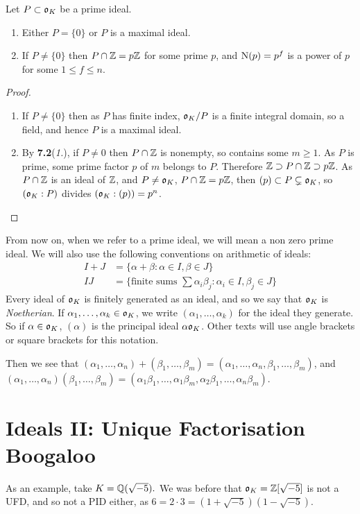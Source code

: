 \documentclass[10pt,a4paper]{article}
\begin{document}
\begin{lemma}
Let $P \subset \mathfrak{o}_K$ be a prime ideal.
\begin{enumerate}
\item Either $P = \{0\}$ or $P$ is a maximal ideal.
\item If $P \neq \{0\}$ then $P \cap \mathbb{Z} = p\mathbb{Z}$ for some prime $p$, and $\operatorname{N}(p) = p^f$ is a power of $p$ for some $1 \leq f \leq n$.
\end{enumerate}
\end{lemma}
\begin{proof}
\item
\begin{enumerate}
\item If $P \neq \{0\}$ then as $P$ has finite index, $\mathfrak{o}_K/P$ is a finite integral domain, so a field, and hence $P$ is a maximal ideal.
\item By \textbf{7.2}(\textit{1.}), if $P \neq 0$ then $P \cap \mathbb{Z}$ is nonempty, so contains some $m \geq 1$. As $P$ is prime, some prime factor $p$ of $m$ belongs to $P$. Therefore $\mathbb{Z} \supset P \cap \mathbb{Z} \supset p\mathbb{Z}$. As $P \cap \mathbb{Z}$ is an ideal of $\mathbb{Z}$, and $P \neq \mathfrak{o}_K$, $P \cap \mathbb{Z} = p\mathbb{Z}$, then $(p) \subset P \subsetneq \mathfrak{o}_K$, so $(\mathfrak{o}_K : P)$ divides $(\mathfrak{o}_K:(p)) = p^n$.
\end{enumerate}
\end{proof}
From now on, when we refer to a prime ideal, we will mean a non zero prime ideal. We will also use the following conventions on arithmetic of ideals:
\begin{align*}
I+J &= \{\alpha+\beta : \alpha \in I, \beta \in J\}\\
IJ &= \{\text{finite sums }\sum\alpha_i\beta_j : \alpha_i \in I, \beta_j \in J\}
\end{align*}
Every ideal of $\mathfrak{o}_K$ is finitely generated as an ideal, and so we say that $\mathfrak{o}_K$ is \emph{Noetherian}. If $\alpha_1, \ldots, \alpha_k \in \mathfrak{o}_K$, we write $(\alpha_1, \ldots, \alpha_k)$ for the ideal they generate. So if $\alpha \in \mathfrak{o}_K$, $(\alpha)$ is the principal ideal $\alpha \mathfrak{o}_K$. Other texts will use angle brackets or square brackets for this notation.

Then we see that $(\alpha_1, \ldots, \alpha_n) + (\beta_1, \ldots, \beta_m) = (\alpha_1, \ldots, \alpha_n, \beta_1, \ldots, \beta_m)$, and $(\alpha_1, \ldots, \alpha_n)(\beta_1, \ldots, \beta_m) = (\alpha_1\beta_1, \ldots, \alpha_1\beta_m, \alpha_2\beta_1, \ldots, \alpha_n\beta_m)$.

\section{Ideals II: Unique Factorisation Boogaloo}
As an example, take $K = \mathbb{Q}(\sqrt{-5}).$ We was before that $\mathfrak{o}_K = \mathbb{Z}[\sqrt{-5}]$ is not a UFD, and so not a PID either, as $6 = 2\cdot 3 = (1+\sqrt{-5})(1-\sqrt{-5})$.
\end{document}
